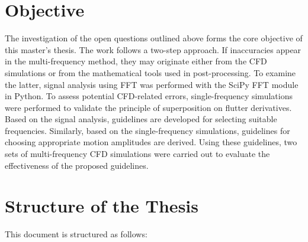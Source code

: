 \documentclass[../main]{subfiles}
\begin{document}
\section{Objective}
The investigation of the open questions outlined above forms the core objective of this master's thesis. The work follows 
a two-step approach. If inaccuracies appear in the multi-frequency method, they may originate either from the CFD simulations 
or from the mathematical tools used in post-processing. To examine the latter, signal analysis using FFT was performed with 
the SciPy FFT module in Python. To assess potential CFD-related errors, single-frequency simulations were performed to validate 
the principle of superposition on flutter derivatives. Based on the signal analysis, guidelines are developed for selecting 
suitable frequencies. Similarly, based on the single-frequency simulations, guidelines for choosing appropriate motion 
amplitudes are derived. Using these guidelines, two sets of multi-frequency CFD simulations were carried out to evaluate 
the effectiveness of the proposed guidelines. 

\section{Structure of the Thesis}
This document is structured as follows:
\end{document}
